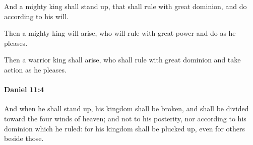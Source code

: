 			\begin{versebox}
					\item[BHS] 
					\item[LXX] 
					\item[ASV] And a mighty king shall stand up, that shall rule with great dominion, and do according to his will.
					\item[NIV] Then a mighty king will arise, who will rule with great power and do as he pleases.
					\item[NRSV] Then a warrior king shall arise, who shall rule with great dominion and take action as he pleases.
			\end{versebox}

		\paragraph{Daniel 11:4} %
			\label{DANIEL-11-4}

			And when he shall stand up, his kingdom shall be broken, and shall be divided toward the four winds of heaven; and not to his posterity, nor according to his dominion which he ruled: for his kingdom shall be plucked up, even for others beside those.

